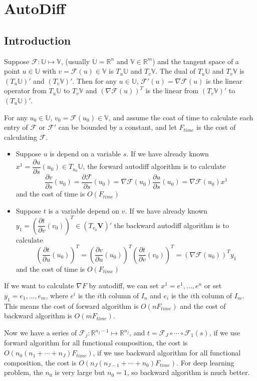\chapter{AutoDiff}
\section{Introduction}
Suppose $\mathcal F:\mathbb U \mapsto \mathbb V$, (usually $\mathbb U = \mathbb R^n$ and $\mathbb V\in\mathbb R^m$) and the tangent space of a point $u\in\mathbb U$ with $v=\mathcal F(u) \in \mathbb V$ is $T_u\mathbb U$ and $T_v\mathbb V$. The dual of  $T_u\mathbb U$ and $T_v\mathbb V$ is  $(T_u\mathbb U)'$ and $(T_v\mathbb V)'$. Then for any $u\in\mathbb U$, $\mathcal{F}'(u)=\nabla \mathcal{F}(u)$ is the linear operator from $T_u\mathbb U$ to $T_v\mathbb V$ and $(\nabla \mathcal{F}(u))^T$ is the linear from $(T_v\mathbb V)'$ to $(T_u\mathbb U)'$.

 For any $u_0\in \mathbb U$, $v_0=\mathcal{F}(u_0)\in\mathbb V$, and assume the coat of time to calculate each entry of $\mathcal F$ or $\mathcal{F}'$ can be bounded by a constant, and let $F_{time}$ is the cost of calculating $\mathcal F$.
\begin{itemize}
	\item  Suppose $u$ is depend on a variable $s$. If we have already known $x^1=\dfrac{\partial u}{\partial s}(u_0)\in T_{u_0}\mathbb U$, the forward autodiff algorithm is to calculate
	\begin{equation}
	\dfrac{\partial v}{\partial s}(u_0)=	\dfrac{\partial \mathcal F}{\partial s}(u_0)=\nabla \mathcal F(u_0) \dfrac{\partial u}{\partial s}(u_0)=\nabla \mathcal F(u_0) x^1
	\end{equation}
	and the cost of time is $O(F_{time})$
 	\item  Suppose $t$ is a variable depend on $v$. If we have already known $y_1=(\dfrac{\partial t}{\partial v}(v_0))^T\in (T_{v_0}\mathbf V)'$ the backward autodiff algorithm is to calculate
 	\begin{equation}
 	(\dfrac{\partial t}{\partial u}(u_0))^T=(\dfrac{\partial v}{\partial u}(u_0))^T(\dfrac{\partial t}{\partial v}(v_0))^T=(\nabla \mathcal{F}(u_0))^T y_1
 	\end{equation}
 	and the cost of time is $O(F_{time})$
\end{itemize}

If we want to calculate $\nabla F$ by autodiff, we can set $x^1=e^1,...,e^n$ or set $y_1=e_1,...,e_m$, where $e^i$ is the $i$th column of $I_n$ and $e_i$ is the $i$th column of $I_m$. This means the cost of forward algorithm is $O(nF_{time})$ and the cost of backward algorithm is $O(mF_{time})$.

Now we have a series of $\mathcal F_j:\mathbb R^{n_j-1}\mapsto\mathbb R^{n_j}$, and $t=\mathcal{F}_J\circ\cdots\circ \mathcal{F}_1(s)$, if we use forward algorithm for all functional composition, the cost is $O(n_0(n_1+\cdots+n_J)F_{time})$, if we use backward  algorithm for all functional composition, the cost is $O(n_J(n_{J-1}+\cdots+n_0)F_{time})$. For deep learning problem, the $n_0$ is very large but $n_0=1$, so backward algorithm is much better.